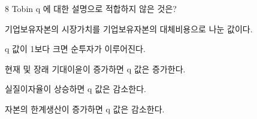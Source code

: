 \begin{question}{8}
Tobin q 에 대한 설명으로 적합하지 않은 것은?
\begin{choices}
  \item 기업보유자본의 시장가치를 기업보유자본의 대체비용으로 나눈 값이다.
  \item q 값이 1보다 크면 순투자가 이루어진다.
  \item 현재 및 장래 기대이윤이 증가하면 q 값은 증가한다.
  \item 실질이자율이 상승하면 q 값은 감소한다.
  \item 자본의 한계생산이 증가하면 q 값은 감소한다.
\end{choices}
\end{question}
